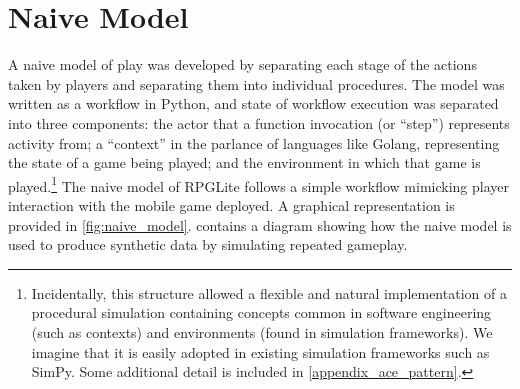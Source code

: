 \section{Naive Model}\label{sec:optimisation_with_aspects_naivemodel}
\label{sec:naive_model}

A naive model of play was developed by separating each stage of the actions
taken by players and separating them into individual procedures. The model was
written as a workflow in Python, and state of workflow execution was separated
into three components: the actor that a function invocation (or ``step'')
represents activity from; a ``context'' in the parlance of languages like
Golang, representing the state of a game being played; and the environment in
which that game is played.\footnote{Incidentally, this structure allowed a
flexible and natural implementation of a procedural simulation containing
concepts common in software engineering (such as contexts) and environments
(found in simulation frameworks). We imagine that it is easily adopted in
existing simulation frameworks such as SimPy\cite{simpy_intro}. Some additional
detail is included in \cref{appendix_ace_pattern}.} The naive model of RPGLite
follows a simple workflow mimicking player interaction with the mobile game
deployed. A graphical representation is provided in \cref{fig:naive_model}.
 contains a diagram showing
how the naive model is used to produce synthetic data by simulating repeated
gameplay.

